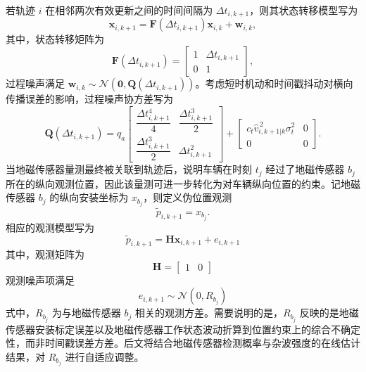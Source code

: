 \documentclass{xdupgthesis}
\begin{document}
若轨迹 $i$ 在相邻两次有效更新之间的时间间隔为 $\Delta t_{i,k+1}$，则其状态转移模型写为
\begin{equation}
	\mathbf x_{i,k+1}=
	\mathbf F\left(\Delta t_{i,k+1}\right)\mathbf x_{i,k}+\mathbf w_{i,k},
	\label{eq:ch3_state_transition}
\end{equation}
其中，状态转移矩阵为
\begin{equation}
	\mathbf F\left(\Delta t_{i,k+1}\right)=
	\begin{bmatrix}
		1 & \Delta t_{i,k+1}\\
		0 & 1
	\end{bmatrix},
	\label{eq:ch3_F}
\end{equation}
过程噪声满足 $\mathbf w_{i,k}\sim\mathcal N(\mathbf 0,\mathbf Q(\Delta t_{i,k+1}))$。考虑短时机动和时间戳抖动对横向传播误差的影响，过程噪声协方差写为
\begin{equation}
	\mathbf Q\left(\Delta t_{i,k+1}\right)
	=
	q_a
	\begin{bmatrix}
		\dfrac{\Delta t_{i,k+1}^{4}}{4} & \dfrac{\Delta t_{i,k+1}^{3}}{2}\\[6pt]
		\dfrac{\Delta t_{i,k+1}^{3}}{2} & \Delta t_{i,k+1}^{2}
	\end{bmatrix}
	+
	\begin{bmatrix}
		c_t \hat v_{i,k+1|k}^{\,2}\sigma_t^2 & 0\\
		0 & 0
	\end{bmatrix}.
	\label{eq:ch3_Q}
\end{equation}
当地磁传感器量测最终被关联到轨迹后，说明车辆在时刻 $t_j$ 经过了地磁传感器 $b_j$ 所在的纵向观测位置，因此该量测可进一步转化为对车辆纵向位置的约束。记地磁传感器 $b_j$ 的纵向安装坐标为 $x_{b_j}$，则定义伪位置观测
\begin{equation}
	\tilde p_{i,k+1}=x_{b_j}.
	\label{eq:ch3_pseudo_meas}
\end{equation}
相应的观测模型写为
\begin{equation}
	\tilde p_{i,k+1}=\mathbf H\mathbf x_{i,k+1}+e_{i,k+1}
\end{equation}
其中，观测矩阵为
\begin{equation}
	\mathbf H=
	\begin{bmatrix}
		1 & 0
	\end{bmatrix}
\end{equation}
观测噪声项满足
\begin{equation}
	e_{i,k+1}\sim\mathcal N(0,R_{b_j})
	\label{eq:ch3_measurement_k}
\end{equation}
式中，$R_{b_j}$ 为与地磁传感器 $b_j$ 相关的观测方差。需要说明的是，$R_{b_j}$ 反映的是地磁传感器安装标定误差以及地磁传感器工作状态波动折算到位置约束上的综合不确定性，而非时间戳误差方差。后文将结合地磁传感器检测概率与杂波强度的在线估计结果，对 $R_{b_j}$ 进行自适应调整。
\end{document}
